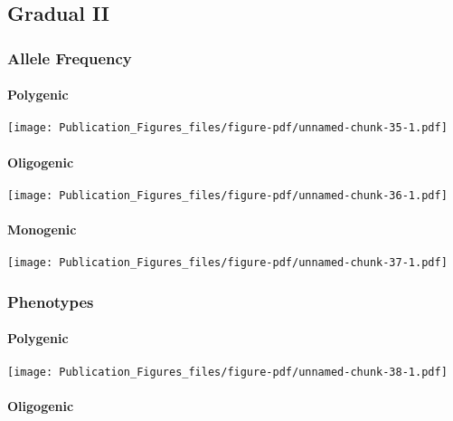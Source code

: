 \documentclass[
  letterpaper,
  DIV=11,
  numbers=noendperiod]{scrartcl}
\begin{document}
\hypertarget{gradual-ii}{%
\subsection{Gradual II}\label{gradual-ii}}

\hypertarget{allele-frequency-1}{%
\subsubsection{Allele Frequency}\label{allele-frequency-1}}

\hypertarget{polygenic-1}{%
\paragraph{Polygenic}\label{polygenic-1}}

\texttt{[image: Publication\_Figures\_files/figure-pdf/unnamed-chunk-35-1.pdf]}

\hypertarget{oligogenic-1}{%
\paragraph{Oligogenic}\label{oligogenic-1}}

\texttt{[image: Publication\_Figures\_files/figure-pdf/unnamed-chunk-36-1.pdf]}

\hypertarget{monogenic-1}{%
\paragraph{Monogenic}\label{monogenic-1}}

\texttt{[image: Publication\_Figures\_files/figure-pdf/unnamed-chunk-37-1.pdf]}

\hypertarget{phenotypes-1}{%
\subsubsection{Phenotypes}\label{phenotypes-1}}

\hypertarget{polygenic-2}{%
\paragraph{Polygenic}\label{polygenic-2}}

\texttt{[image: Publication\_Figures\_files/figure-pdf/unnamed-chunk-38-1.pdf]}

\hypertarget{oligogenic-2}{%
\paragraph{Oligogenic}\label{oligogenic-2}}
\end{document}

